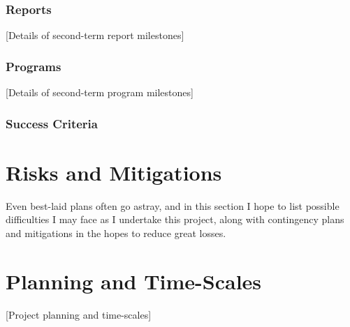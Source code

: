 \documentclass[a4paper,12pt]{article}
\begin{document}
\subsubsection{Reports}
[Details of second-term report milestones]

\subsubsection{Programs}
[Details of second-term program milestones]

\subsubsection{Success Criteria}

\section{Risks and Mitigations}
Even best-laid plans often go astray, and in this section I hope to list possible difficulties I may face as I undertake this project, along with contingency plans and mitigations in the hopes to reduce great losses.


\section{Planning and Time-Scales}
[Project planning and time-scales]


\end{document}
